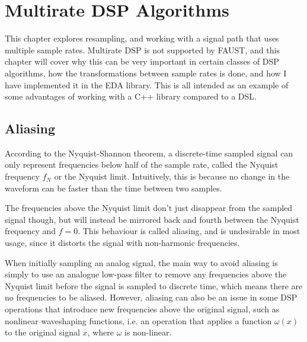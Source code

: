 \chapter{Multirate DSP Algorithms}
\label{chap:multirate}

This chapter explores resampling, and working with a signal path that uses multiple sample rates. Multirate
DSP is not supported by FAUST\autocite{faustwebsite}, and this chapter will cover why this can be very
important in certain classes of DSP algorithms, how the transformations between sample rates is done, and how
I have implemented it in the EDA library. This is all intended as an example of some advantages of working
with a C++ library compared to a DSL.

\section{Aliasing}

According to the Nyquist-Shannon theorem\autocite{shannon49}, a discrete-time sampled signal can only
represent frequencies below half of the sample rate, called the Nyquist frequency $f_N$ or
the Nyquist limit. Intuitively, this is because no change in the waveform can be faster than the time between
two samples.

The frequencies above the Nyquist limit don't just disappear from the sampled signal though, but will instead
be mirrored back and fourth between the Nyquist frequency and $f = 0$. This behaviour is
called aliasing, and is undesirable in most usage, since it distorts the signal with non-harmonic
frequencies.

When initially sampling an analog signal, the main way to avoid aliasing is simply to use an analogue
low-pass filter to remove any frequencies above the Nyquist limit before the signal is sampled to discrete
time\autocite{an699},  which means there are no frequencies to be aliased. However, aliasing can also
be an issue in some DSP operations that introduce new frequencies above the original signal, such as
nonlinear waveshaping functions, i.e. an operation that applies a function $\omega(x)$ to the
original signal $x$, where $\omega$ is non-linear.

